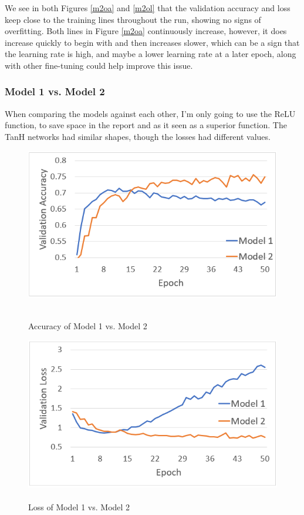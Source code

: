 \documentclass[a4paper, 11pt]{article}
\begin{document}
We see in both Figures \ref{m2oa} and \ref{m2ol} that the validation accuracy and loss keep close to the training lines throughout the run, showing no signs of overfitting. Both lines in Figure \ref{m2oa} continuously increase, however, it does increase quickly to begin with and then increases slower, which can be a sign that the learning rate is high, and maybe a lower learning rate at a later epoch, along with other fine-tuning could help improve this issue.
\subsubsection*{Model 1 vs. Model 2}

When comparing the models against each other, I'm only going to use the ReLU function, to save space in the report and as it seen as a superior function. The TanH networks had similar shapes, though the losses had different values.

\begin{figure}[h]
\begin{minipage}{0.45\textwidth}
\captionsetup{justification=centering}
\centering
\includegraphics[scale=0.45]{12modelcomprelu}
\caption[caption]{\\ Accuracy of Model 1 vs. Model 2}
\label{m1m2ra}%
\end{minipage}
\begin{minipage}{0.45\textwidth}
\captionsetup{justification=centering}
\centering
\includegraphics[scale=0.45]{12modelcompreluloss}
\caption{\\ Loss of Model 1 vs. Model 2}
\label{m1m2rl}%
\end{minipage}
\end{figure}
\end{document}
